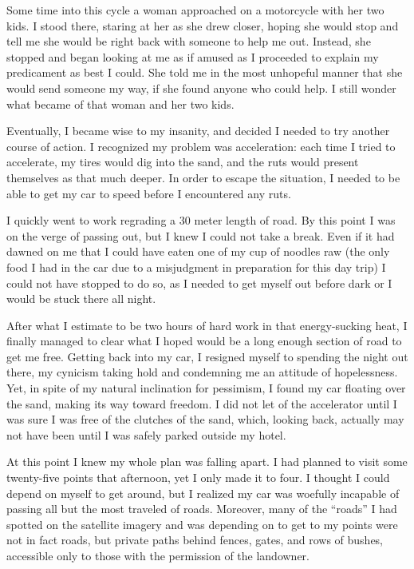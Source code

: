 Some time into this cycle a woman approached on a motorcycle with her two kids. I stood there, staring at her as she drew closer, hoping she would stop and tell me she would be right back with someone to help me out. Instead, she stopped and began looking at me as if amused as I proceeded to explain my predicament as best I could. She told me in the most unhopeful manner that she would send someone my way, if she found anyone who could help. I still wonder what became of that woman and her two kids.

Eventually, I became wise to my insanity, and decided I needed to try another course of action. I recognized my problem was acceleration: each time I tried to accelerate, my tires would dig into the sand, and the ruts would present themselves as that much deeper. In order to escape the situation, I needed to be able to get my car to speed before I encountered any ruts.

I quickly went to work regrading a 30 meter length of road. By this point I was on the verge of passing out, but I knew I could not take a break. Even if it had dawned on me that I could have eaten one of my cup of noodles raw (the only food I had in the car due to a misjudgment in preparation for this day trip) I could not have stopped to do so, as I needed to get myself out before dark or I would be stuck there all night.

After what I estimate to be two hours of hard work in that energy-sucking heat, I finally managed to clear what I hoped would be a long enough section of road to get me free. Getting back into my car, I resigned myself to spending the night out there, my cynicism taking hold and condemning me an attitude of hopelessness. Yet, in spite of my natural inclination for pessimism, I found my car floating over the sand, making its way toward freedom. I did not let of the accelerator until I was sure I was free of the clutches of the sand, which, looking back, actually may not have been until I was safely parked outside my hotel.

At this point I knew my whole plan was falling apart. I had planned to visit some twenty-five points that afternoon, yet I only made it to four. I thought I could depend on myself to get around, but I realized my car was woefully incapable of passing all but the most traveled of roads. Moreover, many of the “roads” I had spotted on the satellite imagery and was depending on to get to my points were not in fact roads, but private paths behind fences, gates, and rows of bushes, accessible only to those with the permission of the landowner.


